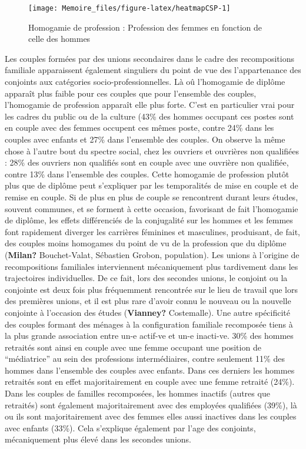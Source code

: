 \documentclass[
  12pt,
]{book}
\begin{document}
\begin{figure}[h]

{\centering \texttt{[image: Memoire\_files/figure-latex/heatmapCSP-1]} 

}

\caption{Homogamie de profession : Profession des femmes en fonction de celle des hommes}\label{fig:heatmapCSP}
\end{figure}

Les couples formées par des unions secondaires dans le cadre des
recompositions familiale apparaissent également singuliers du point de
vue des l'appartenance des conjoints aux catégories
socio-professionnelles. Là oû l'homogamie de diplôme apparaît plus
faible pour ces couples que pour l'ensemble des couples, l'homogamie de
profession apparaît elle plus forte. C'est en particulier vrai pour les
cadres du public ou de la culture (43\% des hommes occupant ces postes
sont en couple avec des femmes occupent ces mêmes poste, contre 24\%
dans les couples avec enfants et 27\% dans l'ensemble des couples. On
observe la même chose à l'autre bout du spectre social, chez les
ouvriers et ouvrières non qualifiées : 28\% des ouvriers non qualifiés
sont en couple avec une ouvrière non qualifiée, contre 13\% dans
l'ensemble des couples. Cette homogamie de profession plutôt plus que de
diplôme peut s'expliquer par les temporalités de mise en couple et de
remise en couple. Si de plus en plus de couple se rencontrent durant
leurs études, souvent communes, et se forment à cette occasion,
favorisant de fait l'homogamie de diplôme, les effets différenciés de la
conjugalité sur les hommes et les femmes font rapidement diverger les
carrières féminines et masculines, produisant, de fait, des couples
moins homogames du point de vu de la profession que du diplôme
(\textbf{Milan?} Bouchet-Valat, Sébastien Grobon, population). Les
unions à l'origine de recompositions familiales interviennent
mécaniquement plus tardivement dans les trajectoires individuelles. De
ce fait, lors des secondes unions, le conjoint ou la conjointe est deux
fois plus fréquemment rencontrée sur le lieu de travail que lors des
premières unions, et il est plus rare d'avoir connu le nouveau ou la
nouvelle conjointe à l'occasion des études (\textbf{Vianney?}
Costemalle). Une autre spécificité des couples formant des ménages à la
configuration familiale recomposée tiens à la plus grande association
entre un-e actif-ve et un-e inacti-ve. 30\% des hommes retraités sont
ainsi en couple avec une femme occupant une position de ``médiatrice''
au sein des professions intermédiaires, contre seulement 11\% des hommes
dans l'ensemble des couples avec enfants. Dans ces derniers les hommes
retraités sont en effet majoritairement en couple avec une femme
retraité (24\%). Dans les couples de familles recomposées, les hommes
inactifs (autres que retraités) sont également majoritairement avec des
employées qualifiées (39\%), là ou ils sont majoritairement avec des
femmes elles aussi inactives dans les couples avec enfants (33\%). Cela
s'explique également par l'age des conjoints, mécaniquement plus élevé
dans les secondes unions.
\end{document}

